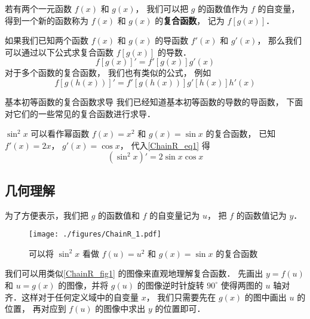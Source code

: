 
若有两个一元函数 $f(x)$ 和 $g(x)$， 我们可以把 $g$ 的函数值作为 $f$ 的自变量， 得到一个新的函数称为 $f(x)$ 和 $g(x)$ 的\textbf{复合函数}， 记为 $f[g(x)]$．

如果我们已知两个函数 $f(x)$ 和 $g(x)$ 的导函数 $f'(x)$ 和 $g'(x)$， 那么我们可以通过以下公式求复合函数 $f[g(x)]$ 的导数．
\begin{equation}\label{ChainR_eq1}
f[g(x)]' = f'[g(x)]g'(x)
\end{equation}
对于多个函数的复合函数， 我们也有类似的公式， 例如
\begin{equation}
f[g(h(x))]' = f'[g(h(x))]g'[h(x)]h'(x)
\end{equation}

\begin{example}{基本初等函数的复合函数求导}
我们已经知道基本初等函数的导数的导函数， 下面对它们的一些常见的复合函数进行求导．

$\sin^2 x$ 可以看作幂函数 $f(x) = x^2$ 和 $g(x) = \sin x$ 的复合函数， 已知 $f'(x) = 2x$， $g'(x) = \cos x$， 代入\autoref{ChainR_eq1} 得
\begin{equation}
(\sin^2 x)' = 2\sin x \cos x
\end{equation}

\end{example}

\subsection{几何理解}
为了方便表示，我们把 $g$ 的函数值和 $f$ 的自变量记为 $u$， 把 $f$ 的函数值记为 $y$．

\begin{figure}[ht]
\centering
\texttt{[image: ./figures/ChainR\_1.pdf]}
\caption{可以将 $\sin^2 x$ 看做 $f(u) = u^2$ 和 $g(x) = \sin x$ 的复合函数}\label{ChainR_fig1}
\end{figure}

我们可以用类似\autoref{ChainR_fig1} 的图像来直观地理解复合函数． 先画出 $y = f(u)$ 和 $u = g(x)$ 的图像，并将 $g(u)$ 的图像逆时针旋转 $90^\circ$ 使得两图的 $u$ 轴对齐．这样对于任何定义域中的自变量 $x$， 我们只需要先在 $g(x)$ 的图中画出 $u$ 的位置， 再对应到 $f(u)$ 的图像中求出 $y$ 的位置即可． 

